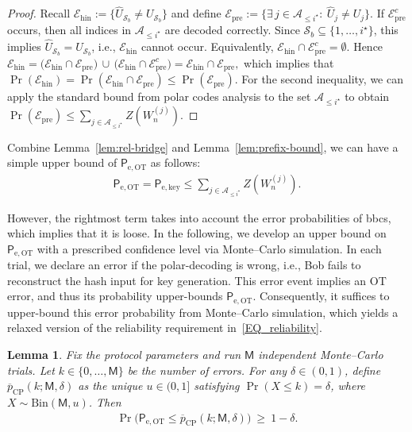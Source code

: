 \documentclass[onecolumn]{IEEEtran} %
\newcommand{\1}{\mathbbm{1}}
\theoremstyle{boldremark}
\newtheorem{lemma}{Lemma}
\begin{document}
\begin{proof}
Recall $\mathcal{E}_{\mathrm{hin}}:=\{\widehat U_{\mathcal{S}_b}\neq U_{\mathcal{S}_b}\}$ and define
$\mathcal{E}_{\mathrm{pre}}:=\{\exists\,j\in\mathcal{A}_{\le i^\star}:\ \widehat U_j\neq U_j\}$.
If $\mathcal{E}_{\mathrm{pre}}^c$ occurs, then all indices in $\mathcal{A}_{\le i^\star}$ are decoded correctly. Since $\mathcal{S}_b\subseteq\{1,\dots,i^\star\}$, this implies $\widehat U_{\mathcal{S}_b}=U_{\mathcal{S}_b}$, i.e., $\mathcal{E}_{\mathrm{hin}}$ cannot occur. Equivalently, $\mathcal{E}_{\mathrm{hin}}\cap \mathcal{E}_{\mathrm{pre}}^c=\emptyset$. Hence $\mathcal{E}_{\mathrm{hin}}  =
  \bigl(\mathcal{E}_{\mathrm{hin}}\cap \mathcal{E}_{\mathrm{pre}}\bigr)
  \,\cup\,  \bigl(\mathcal{E}_{\mathrm{hin}}\cap \mathcal{E}_{\mathrm{pre}}^c\bigr)  =
  \mathcal{E}_{\mathrm{hin}}\cap \mathcal{E}_{\mathrm{pre}},$ which implies that $
  \Pr(\mathcal{E}_{\mathrm{hin}})  =  \Pr(\mathcal{E}_{\mathrm{hin}}\cap \mathcal{E}_{\mathrm{pre}})
  \le  \Pr(\mathcal{E}_{\mathrm{pre}})$. For the second inequality, we can apply the standard bound from polar codes analysis \cite{arikan2009} to the set $\mathcal{A}_{\le i^\star}$ to obtain $\Pr(\mathcal{E}_{\mathrm{pre}})\le \sum_{j\in\mathcal{A}_{\le i^\star}} Z(W_n^{(j)})$.
\end{proof}


Combine Lemma~\ref{lem:rel-bridge} and Lemma~\ref{lem:prefix-bound}, we can have a simple upper bound of $\textsf{P}_{\mathrm{e,OT}}$ as follows:
\begin{align}\label{EQ_Pe_UB}
  \textsf{P}_{\mathrm{e,OT}} = \textsf{P}_{\mathrm{e,key}}
  \le \sum_{j\in\mathcal{A}_{\le i^\star}} Z(W_n^{(j)}).  
\end{align}
  
However, the rightmost term takes into account the error probabilities of \gls{bbcs}, which implies that it is loose.
In the following, we develop an upper bound on $\textsf{P}_{\mathrm{e,OT}}$ with a prescribed confidence level via
Monte--Carlo simulation.
In each trial, we declare an error if the polar-decoding is wrong, i.e., Bob fails to reconstruct the hash input for key generation. This error event implies an OT error, and thus its probability upper-bounds
$\textsf{P}_{\mathrm{e,OT}}$. Consequently, it suffices to upper-bound this error probability from Monte--Carlo
simulation, which yields a relaxed version of the reliability requirement in~\eqref{EQ_reliability}.

\begin{lemma}\label{lem:cp-ot}
Fix the protocol parameters and run $\textsf{M}$ independent Monte--Carlo trials. Let $k\in\{0,\dots,\textsf{M}\}$
be the number of errors.
For any $\delta\in(0,1)$, define $\overline p_{\mathrm{CP}}(k;\textsf{M},\delta)$ as the unique $u\in(0,1]$ satisfying
$\Pr(X\le k)=\delta$, where $X\sim\mathrm{Bin}(\textsf{M},u)$. Then
\begin{align}\label{EQ_reliability_to_PeGBC}
\Pr\!\Big(\textsf{P}_{\mathrm{e,OT}}\le \overline p_{\mathrm{CP}}(k;\textsf{M},\delta)\Big)\ \ge\ 1-\delta .
\end{align}
\end{lemma}
\end{document}
